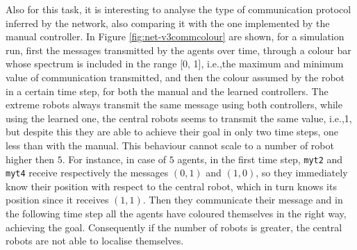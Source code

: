 Also for this task, it is interesting to analyse the type of communication protocol 
inferred by the network, also comparing it with the one implemented by the 
manual controller. 
In Figure \ref{fig:net-v3commcolour} are shown, for a simulation run, first the 
messages transmitted by the agents over time, through a colour bar whose 
spectrum is included in the range [0, 1], i.e.,the maximum and minimum value of 
communication transmitted, and then the colour assumed by the robot in a 
certain time step, for both the manual and the learned controllers.
The extreme robots always transmit the same message using both controllers, 
while using the learned one, the central robots seems to transmit the same value, 
i.e.,1, but despite this they are able to achieve their goal in only two time steps, 
one less than with the manual. This behaviour cannot scale to a number of robot 
higher then $5$. For instance, in case of $5$ agents, in the first time step, 
\texttt{myt2} and \texttt{myt4} receive respectively the messages $(0, 1)$ and $(1, 
0)$, so they immediately know their position with respect to the central robot, 
which in turn knows its position since it receives $(1, 1)$. Then they communicate 
their message and in the following time step all the agents have coloured 
themselves in the right way, achieving the goal.
Consequently if the number of robots is greater, the central robots are not able to 
localise themselves. 
